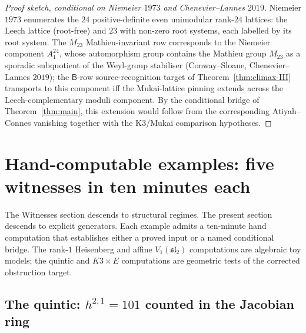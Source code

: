 \documentclass[11pt,reqno]{amsart}
\theoremstyle{plain}
\theoremstyle{definition}
\theoremstyle{remark}
\newcommand{\sfB}{\mathsf{B}}
\begin{document}
\begin{proof}[Proof sketch, conditional on Niemeier $1973$ and Chenevier--Lannes $2019$]
Niemeier $1973$ enumerates the $24$ positive-definite even unimodular rank-$24$ lattices: the Leech lattice (root-free) and $23$ with non-zero root systems, each labelled by its root system. The $M_{23}$ Mathieu-invariant row corresponds to the Niemeier component $A_1^{24}$, whose automorphism group contains the Mathieu group $M_{23}$ as a sporadic subquotient of the Weyl-group stabiliser (Conway--Sloane, Chenevier--Lannes $2019$); the $\sfB$-row source-recognition target of Theorem~\ref{thm:climax-III} transports to this component iff the Mukai-lattice pinning extends across the Leech-complementary moduli component. By the conditional bridge of Theorem~\ref{thm:main}, this extension would follow from the corresponding Atiyah--Connes vanishing together with the K3/Mukai comparison hypotheses.
\end{proof}

\section{Hand-computable examples: five witnesses in ten minutes each}
\label{sec:hand-computable}

The Witnesses section descends to structural regimes. The present section descends to explicit generators. Each example admits a ten-minute hand computation that establishes either a proved input or a named conditional bridge. The rank-$1$ Heisenberg and affine $V_1(\mathfrak{sl}_2)$ computations are algebraic toy models; the quintic and $K3\times E$ computations are geometric tests of the corrected obstruction target.

\subsection{The quintic: $h^{2,1} = 101$ counted in the Jacobian ring}
\label{sub:hand-quintic}
\end{document}
